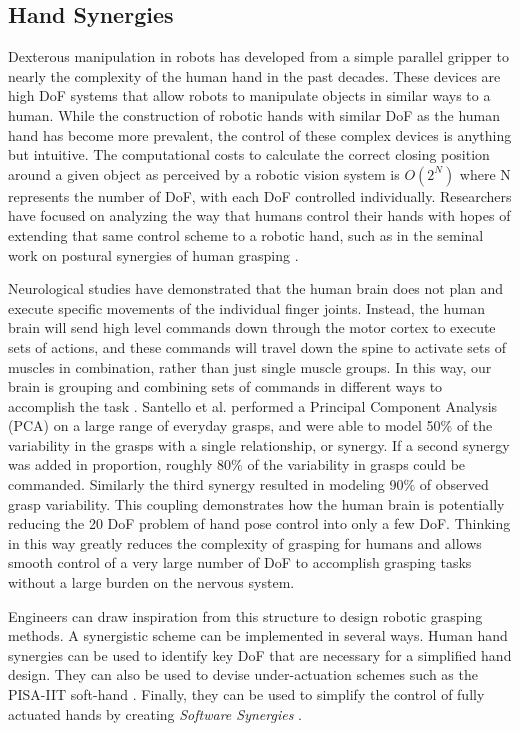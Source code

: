 \documentclass[runningheads,a4paper]{llncs}
\begin{document}
\subsection{Hand Synergies}
	Dexterous manipulation in robots has developed from a simple parallel gripper to nearly the complexity of the human hand in the past decades. These devices are high DoF systems that allow robots to manipulate objects in similar ways to a human. While the construction of robotic hands with similar DoF as the human hand has become more prevalent, the control of these complex devices is anything but intuitive. The computational costs to calculate the correct closing position around a given object as perceived by a robotic vision system is $O(2^N)$
 where N represents the number of DoF, with each DoF controlled individually. Researchers have focused on analyzing the way that humans control their hands with hopes of extending that same control scheme to a robotic hand, such as in the seminal work on postural synergies of human grasping \cite{Santello}. 

Neurological studies have demonstrated that the human brain does not plan and execute specific movements of the individual finger joints. Instead, the human brain will send high level commands down through the motor cortex to execute sets of actions, and these commands will travel down the spine to activate sets of muscles in combination, rather than just single muscle groups. In this way, our brain is grouping and combining sets of commands in different ways to accomplish the task \cite{neuro}. Santello et al. performed a Principal Component Analysis (PCA) on a large range of everyday grasps, and were able to model 50$\%$ of the variability in the grasps with a single relationship, or synergy. If a second synergy was added in proportion, roughly 80$\%$ of the variability in grasps could be commanded. Similarly the third synergy resulted in modeling 90$\%$ of observed grasp variability. This coupling demonstrates how the human brain is potentially reducing the 20 DoF problem of hand pose control into only a few  DoF. Thinking in this way greatly reduces the complexity of grasping for humans and allows smooth control of a very large number of  DoF to accomplish grasping tasks without a large burden on the nervous system. 

 Engineers can draw inspiration from this structure to design robotic grasping methods. A synergistic scheme can be implemented in several ways. Human hand synergies can be used to identify key  DoF that are necessary for a simplified hand design. They can also be used to devise under-actuation schemes such as the PISA-IIT soft-hand \cite{softhand}. Finally, they can be used to simplify the control of fully actuated hands by creating \textit{Software Synergies} \cite{catalano_2012_adaptive}. 
\end{document}
